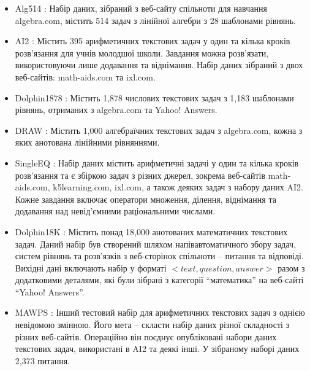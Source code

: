 \begin{itemize}
    \item {Alg514} \cite{kushman-etal-2014-learning}: Набір даних, зібраний з веб-сайту спільноти для навчання algebra.com, містить 514 задач з лінійної алгебри з 28 шаблонами рівнянь.
    
    \item {AI2} \cite{hosseini-etal-2014-learning}: Містить 395 арифметичних текстових задач у один та кілька кроків розв'язання для учнів молодшої школи. Завдання можна розв'язати, використовуючи лише додавання та віднімання. Набір даних зібраний з двох веб-сайтів: math-aids.com та ixl.com.
    
    \item {Dolphin1878} \cite{shi-etal-2015-automatically}: Містить 1,878 числових текстових задач з 1,183 шаблонами рівнянь, отриманих з algebra.com та Yahoo! Answers.
    
    \item {DRAW} \cite{Upadhyay2015DRAWAC}: Містить 1,000 алгебраїчних текстових задач з algebra.com, кожна з яких анотована лінійними рівняннями.
    
    \item {SingleEQ} \cite{koncel2015parsing}: Набір даних містить арифметичні задачі у один та кілька кроків розв'язання та є збіркою задач з різних джерел, зокрема веб-сайтів math-aids.com, k5learning.com, ixl.com, а також деяких задач з набору даних AI2. Кожне завдання включає оператори множення, ділення, віднімання та додавання над невід'ємними раціональними числами.
    
    \item {Dolphin18K} \cite{huang-etal-2016-well}: Містить понад 18,000 анотованих математичних текстових задач. Даний набір був створений шляхом напівавтоматичного збору задач, систем рівнянь та розв'язків з веб-сторінок спільноти -- питання та відповіді. Вихідні дані включають набір у форматі $<text, question, answer>$ разом з додатковими деталями, які були зібрані з категорії ``математика'' на веб-сайті ``Yahoo! Answers''.
    
    \item {MAWPS} \cite{koncel-kedziorski-etal-2016-mawps}: Інший тестовий набір для арифметичних текстових задач з однією невідомою змінною. Його мета -- скласти набір даних різної складності з різних веб-сайтів. Операційно він поєднує опубліковані набори даних текстових задач, використані в AI2 та деякі інші. У зібраному наборі даних 2,373 питання.
    

\end{itemize}
